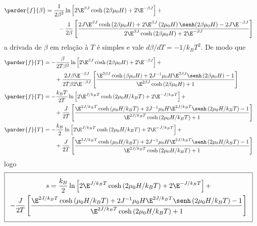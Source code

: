 \begin{prob}
\begin{sol}
\begin{enumerate}[label=\alph *)]
\begin{align}
        \begin{split}
          \parder{f}{\beta}&=\frac{1}{2\beta^2}\ln\left[2\E^{\beta J}\cosh\left(2\beta\mu_0H\right)+2\E^{-\beta J}\right]+\\&\qquad-\frac{1}{2\beta}\left[\frac{2J\E^{\beta J}\cosh\left(2\beta\mu_0H\right)+2\E^{\beta J}\left(2\mu_0H\right)\senh(2\beta\mu_0H)-2J\E^{-\beta J}}{2\E^{\beta J}\cosh\left(2\beta\mu_0H\right)+2\E^{-\beta J}}\right]
        \end{split}
      \end{align}
      a drivada de $\beta$ em relação à $T$ é simples e vale $d\beta/dT=-1/k_BT^2$. De modo que
      \begin{align}
        \begin{split}
          \parder{f}{T}&=-\frac{\beta}{2T\beta^2}\ln\left[2\E^{\beta J}\cosh\left(2\beta\mu_0H\right)+2\E^{-\beta J}\right]+\\&\qquad+\frac{2J\beta\E^{-\beta J}}{2T\beta 2\E^{-\beta J}}\left[\frac{\E^{2\beta J}\cosh\left(\beta\mu_0H\right)+2J^{-1}\mu_0H\E^{2\beta J}\senh\left(2\beta\mu_0H\right)-1}{\E^{2\beta J}\cosh\left(2\beta\mu_0H\right)+1}\right]\\
          \parder{f}{T}&=-\frac{k_BT}{2T}\ln\left[2\E^{J/k_BT}\cosh\left(2\mu_0H/k_BT\right)+2\E^{-J/k_BT}\right]+\\&\qquad+\frac{J}{2T}\left[\frac{\E^{2J/k_BT}\cosh\left(\mu_0H/k_BT\right)+2J^{-1}\mu_0H\E^{2J/k_BT}\senh\left(2\mu_0H/k_BT\right)-1}{\E^{2J/k_BT}\cosh\left(2\mu_0H/k_BT\right)+1}\right]\\
          \parder{f}{T}&=-\frac{k_B}{2}\ln\left[2\E^{J/k_BT}\cosh\left(2\mu_0H/k_BT\right)+2\E^{-J/k_BT}\right]+\\&\qquad+\frac{J}{2T}\left[\frac{\E^{2J/k_BT}\cosh\left(\mu_0H/k_BT\right)+2J^{-1}\mu_0H\E^{2J/k_BT}\senh\left(2\mu_0H/k_BT\right)-1}{\E^{2J/k_BT}\cosh\left(2\mu_0H/k_BT\right)+1}\right]
        \end{split}
      \end{align}
      logo
      \begin{align}
        \label{eq:entropia-prob2b}
        \addtolength{\fboxsep}{5pt}
         \boxed{
         \begin{gathered}
            s=\frac{k_B}{2}\ln\left[2\E^{J/k_BT}\cosh\left(2\mu_0H/k_BT\right)+2\E^{-J/k_BT}\right]+\\-\frac{J}{2T}\left[\frac{\E^{2J/k_BT}\cosh\left(\mu_0H/k_BT\right)+2J^{-1}\mu_0H\E^{2J/k_BT}\senh\left(2\mu_0H/k_BT\right)-1}{\E^{2J/k_BT}\cosh\left(2\mu_0H/k_BT\right)+1}\right]    

\end{gathered}}
\end{align}
\end{enumerate}
\end{sol}
\end{prob}

